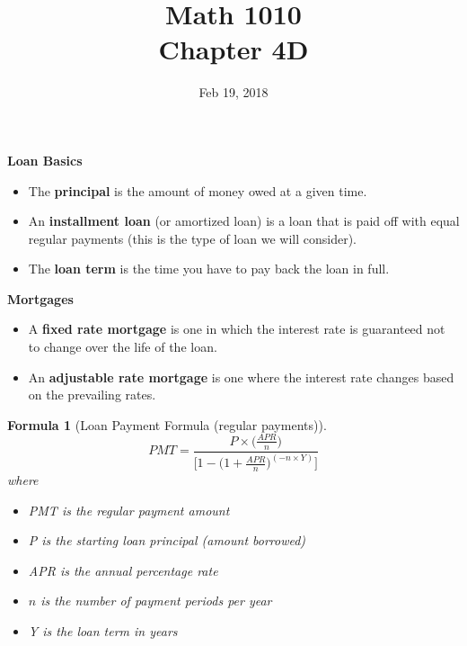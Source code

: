 \documentclass[12pt]{article}
\newtheorem{formula}[theorem]{Formula}
\begin{document}
\title{\bf Math 1010 \\ Chapter 4D\iftoggle{sol}{ Key}{} }
\date{Feb 19, 2018}
\maketitle

{\large \bf Loan Basics}
\begin{itemize}
	\item The {\bf principal} is the amount of money owed at a given time.
	\item An {\bf installment loan} (or amortized loan) is a loan that is paid off with equal regular payments (this is the type of loan we will consider).
	\item The {\bf loan term} is the time you have to pay back the loan in full.
\end{itemize}

{\large \bf Mortgages}
\begin{itemize}
	\item A {\bf fixed rate mortgage} is one in which the interest rate is guaranteed not to change over the life of the loan.
	\item An {\bf adjustable rate mortgage} is one where the interest rate changes based on the prevailing rates.
\end{itemize}

\begin{formula}[Loan Payment Formula (regular payments)]
\begin{equation}\label{eq:loan_formula}
	PMT = \frac{P\times \Big(\frac{APR}{n} \Big)}{\Big[1 - \Big(1 + \frac{APR}{n}\Big)^{(-n\times Y)}\Big]}
\end{equation}
where
\begin{itemize}
	\item PMT is the regular payment amount
	\item P is the starting loan principal (amount borrowed)
	\item APR is the annual percentage rate
	\item $n$ is the number of payment periods per year
	\item Y is the loan term in years
\end{itemize}

\end{formula}
\end{document}
